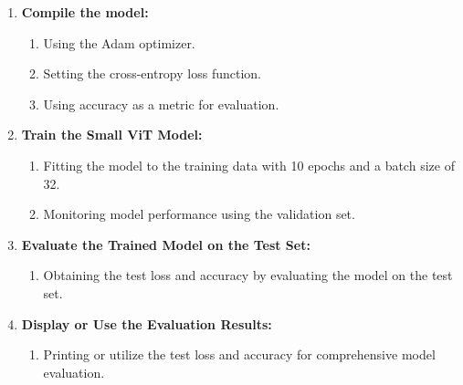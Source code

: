 \begin{enumerate}
    \item \textbf{Compile the model:}
          \begin{enumerate}
             \item Using the Adam optimizer.
             \item Setting the cross-entropy loss function.
             \item Using accuracy as a metric for evaluation.
          \end{enumerate}
 
    \item \textbf{Train the Small ViT Model:}
          \begin{enumerate}
             \item Fitting the model to the training data with 10 epochs and a batch size of 32.
             \item Monitoring model performance using the validation set.
          \end{enumerate}
 
    \item \textbf{Evaluate the Trained Model on the Test Set:}
          \begin{enumerate}
             \item Obtaining the test loss and accuracy by evaluating the model on the test set.
          \end{enumerate}
 
    \item \textbf{Display or Use the Evaluation Results:}
          \begin{enumerate}
             \item Printing or utilize the test loss and accuracy for comprehensive model evaluation.
          \end{enumerate}
 \end{enumerate}
 



